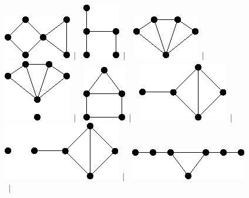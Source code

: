 \documentclass[11pt,paper=b5,footinclude,headinclude]{scrbook} %
\newtheorem{ex}{Vaja\hypertarget{sol:\theex}}[chapter]
\begin{document}
\begin{ex}
\begin{figure}
\includegraphics[scale=0.5]{smallGraphs/g_fish.png}$\,\mid\,$\
\includegraphics[scale=0.5]{smallGraphs/g_fork.png}$\,\mid\,$\
\includegraphics[scale=0.5]{smallGraphs/g_gem.png}$\,\mid\,$\
\includegraphics[scale=0.5]{smallGraphs/g_gemUK1.png}$\,\mid\,$\
\includegraphics[scale=0.5]{smallGraphs/g_house.png}$\,\mid\,$\
\includegraphics[scale=0.5]{smallGraphs/g_kite.png}$\,\mid\,$\
\includegraphics[scale=0.5]{smallGraphs/g_kiteUK1.png}$\,\mid\,$\
\includegraphics[scale=0.5]{smallGraphs/g_longhorn.png}$\,\mid\,$\

\end{figure}
\end{ex}
\end{document}
